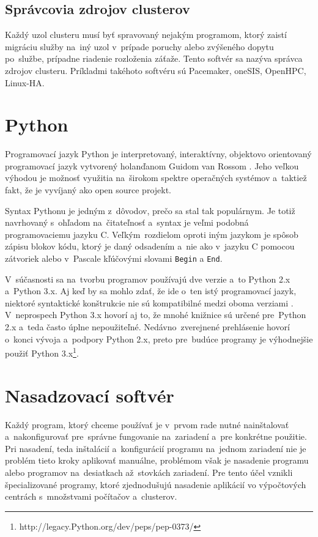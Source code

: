 \subsection*{Správcovia zdrojov clusterov}
Každý uzol clusteru musí byť spravovaný nejakým programom, ktorý zaistí migráciu služby na~iný uzol v~prípade poruchy alebo zvýšeného dopytu po~službe, prípadne riadenie \mbox{rozloženia} \mbox{záťaže}. Tento softvér sa nazýva správca zdrojov clusteru. Príkladmi takéhoto softvéru sú Pacemaker, oneSIS, OpenHPC, Linux-HA.

\section{Python}
Programovací jazyk \mbox{Python} je interpretovaný, interaktívny, objektovo orientovaný programovací jazyk vytvorený holanďanom Guidom van Rossom \cite{python}. Jeho veľkou výhodou je možnosť využitia na~širokom spektre operačných systémov a~taktiež fakt, že je vyvíjaný ako open source projekt.

Syntax \mbox{Python}u je jedným z~dôvodov, prečo sa stal tak populárnym. Je totiž navrhovaný s~ohľadom na~čitateľnosť a~syntax je veľmi podobná programovaciemu jazyku C. \mbox{Veľkým}~rozdielom oproti iným jazykom je spôsob zápisu blokov kódu, ktorý je daný odsadením a~nie ako v~jazyku C pomocou zátvoriek alebo v~Pascale kľúčovými slovami \texttt{Begin} a \texttt{End}.

V~súčasnosti sa na~tvorbu programov používajú dve verzie a~to \mbox{Python} 2.x a~\mbox{Python} 3.x. Aj keď by sa mohlo zdať, že ide o~ten istý programovací jazyk, niektoré syntaktické konštrukcie nie sú kompatibilné medzi oboma verziami \cite{python}. V~neprospech \mbox{Python} 3.x hovorí aj to, že mnohé knižnice sú určené pre~\mbox{Python} 2.x a~teda často úplne \mbox{nepoužiteľné}. \mbox{Nedávno}~zverejnené prehlásenie hovorí o~konci vývoja a~podpory \mbox{Python} 2.x, preto pre~budúce programy je výhodnejšie použiť \mbox{Python} 3.x\footnote[1]{http://legacy.\mbox{Python}.org/dev/peps/pep-0373/}.

\section{Nasadzovací softvér}
\label{nasadenie} 
Každý program, ktorý chceme používať je v~prvom rade nutné nainštalovať a~nakonfigurovať pre~správne fungovanie na~zariadení a~pre konkrétne použitie. Pri nasadení, teda inštalácií a~konfigurácií programu na~jednom zariadení nie je problém tieto kroky aplikovať manuálne, problémom však je nasadenie programu alebo programov na~desiatkach až~stovkách \mbox{zariadení}. Pre tento účel vznikli špecializované programy, ktoré zjednodušujú nasadenie aplikácií vo výpočtových centrách s~množstvami počítačov a~clusterov.

